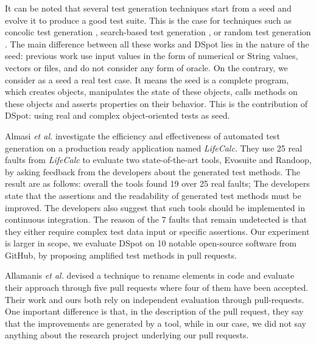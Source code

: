 \documentclass[table,xcdraw,smallextended]{svjour3}
\newcommand{\etal}{\textit{et al.}\xspace}
\newcommand{\dspot}{DSpot\xspace}
\begin{document}
It can be noted that several test generation techniques start from a seed and evolve it to produce a good test suite. This is the case for techniques such as concolic test generation \cite{godefroid2005dart}, search-based test generation \cite{fraser2012seed}, or random  test generation \cite{groce2007randomized}. The main difference between all these works and \dspot lies in the nature of the seed: previous work use input values in the form of numerical or String values, vectors or files, and do not consider any form of oracle. On the contrary, we consider as a seed a real test case.
It means the seed is a complete program, which creates objects, manipulates the state of these objects, calls methods on these objects and asserts properties on their behavior. This is the contribution of \dspot: using real and complex object-oriented tests as seed.


Almasi \etal \cite{IndustrialEvalAlmasi2017} investigate the efficiency and effectiveness of automated test generation on a production ready application named \emph{LifeCalc}. They use 25 real faults from \emph{LifeCalc} to evaluate two state-of-the-art tools, Evosuite and Randoop, by asking feedback from the developers about the generated test methods. The result are as follows:  overall the tools found 19 over 25 real faults; 
The developers state that the assertions and the readability of generated test methods must be improved. The developers also suggest that such tools should be implemented in continuous integration.
The reason of the 7 faults that remain undetected is that they either require complex test data input or specific assertions. Our experiment is larger in scope, we evaluate \dspot on 10 notable open-source software from GitHub, by proposing amplified test methods in pull requests.

Allamanis \etal \cite{pull:request:evaluation} devised a technique to rename elements in code and evaluate their approach through five pull requests where four of them have been accepted. Their work and ours both rely on independent evaluation through pull-requests. One important difference is that, in the description of the pull request, they say that the improvements are generated by a tool, while in our case, we did not say anything about the research project underlying our pull requests.



\end{document}
